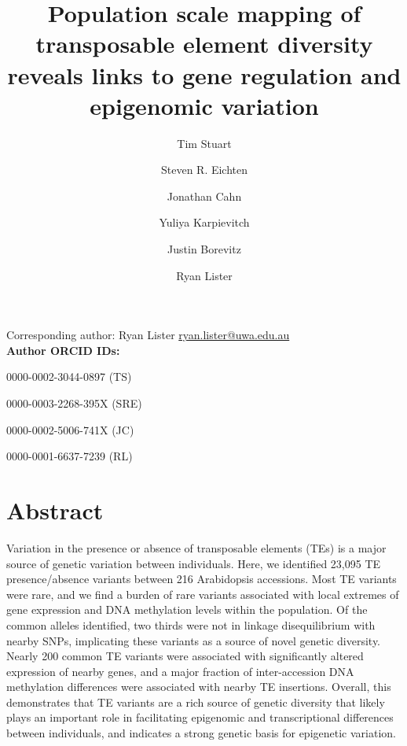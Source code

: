 \documentclass[12pt]{article}
\date{}
\begin{document}
\title{Population scale mapping of transposable element diversity reveals links to gene regulation and epigenomic variation}

\author[1]{Tim Stuart}
\author[2]{Steven R. Eichten}
\author[1]{Jonathan Cahn}
\author[1]{Yuliya Karpievitch}
\author[2]{Justin Borevitz}
\author[1]{Ryan Lister}

\renewcommand\Authands{ and }

\maketitle

Corresponding author: Ryan Lister \href{mailto:ryan.lister@uwa.edu.au}{ryan.lister@uwa.edu.au} \\

\textbf{Author ORCID IDs:}

0000-0002-3044-0897 (TS)

0000-0003-2268-395X (SRE)

0000-0002-5006-741X (JC)

0000-0001-6637-7239 (RL)


\linenumbers

\section{Abstract}

Variation in the presence or absence of transposable elements (TEs) is a
major source of genetic variation between individuals. Here, we
identified 23,095 TE presence/absence variants between 216 Arabidopsis
accessions. Most TE variants were rare, and we find a burden of rare
variants associated with local extremes of gene expression and DNA
methylation levels within the population. Of the common alleles
identified, two thirds were not in linkage disequilibrium with nearby
SNPs, implicating these variants as a source of novel genetic diversity.
Nearly 200 common TE variants were associated with significantly altered
expression of nearby genes, and a major fraction of inter-accession DNA
methylation differences were associated with nearby TE insertions.
Overall, this demonstrates that TE variants are a rich source of genetic
diversity that likely plays an important role in facilitating epigenomic
and transcriptional differences between individuals, and indicates a
strong genetic basis for epigenetic variation.
\end{document}
